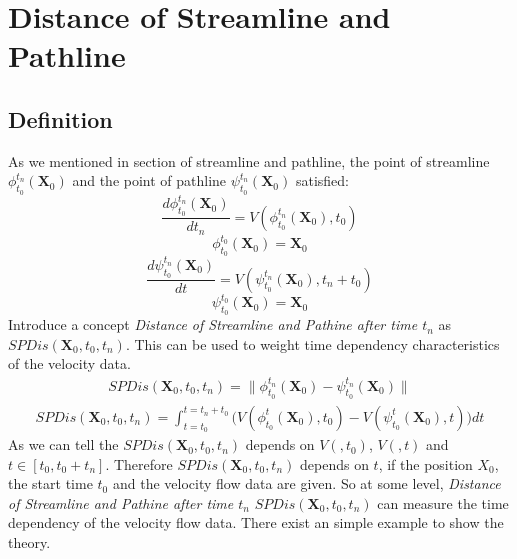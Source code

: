 \documentclass[
     11pt,         %
     a4paper,      %
     oneside,
     ]{article}
\newcommand{\vect}[1]{\boldsymbol{#1}}
\begin{document}
	
	
	\section{Distance of Streamline and Pathline}

	
   \subsection{Definition}
    As we mentioned in section of streamline and pathline, the point of streamline $\phi_{t_{0}}^{t_{n}}(\vect{X}_{0})$ and the point of pathline $\psi_{t_{0}}^{t_{n}}(\vect{X}_{0})$ satisfied:
    $$	\frac{d\phi_{t_{0}}^{t_{n}}(\vect{X}_{0})}{dt_{n}}=V(\phi_{t_{0}}^{t_{n}}(\vect{X}_{0}),t_{0})$$
    	$$\phi_{t_{0}}^{t_{0}}(\vect{X}_{0})=\vect{X}_{0}$$
    $$		\frac{d\psi_{t_{0}}^{t_{n}}(\vect{X}_{0})}{dt}=V(\psi_{t_{0}}^{t_{n}}(\vect{X}_{0}),t_{n}+t_{0})$$
    $$	\psi_{t_{0}}^{t_{0}}(\vect{X}_{0})=\vect{X}_{0}$$
	Introduce a concept \textit{Distance of Streamline and Pathine after time $t_{n}$} as \textbf{$SPDis(\vect{X}_{0},t_{0},t_{n})$}. This can be used to weight time dependency characteristics of the velocity data.
	\begin{eqnarray}
	SPDis(\vect{X}_{0},t_{0},t_{n})=\biggr\lVert\phi_{t_{0}}^{t_{n}}(\vect{X}_{0})-\psi_{t_{0}}^{t_{n}}(\vect{X}_{0})\biggr\rVert
	\end{eqnarray}
	\begin{eqnarray}
	SPDis(\vect{X}_{0},t_{0},t_{n})=\int_{t=t_{0}}^{t=t_{n}+t_{0}}\biggr( V(\phi_{t_{0}}^{t}(\vect{X}_{0}),t_{0})-V(\psi_{t_{0}}^{t}(\vect{X}_{0}),t)\biggr) dt
	\end{eqnarray}
    As we can tell the $SPDis(\vect{X}_{0},t_{0},t_{n})$ depends on $V(,t_{0})$, $V(,t)$ and $t\in [t_{0},t_{0}+t_{n}]$. Therefore $SPDis(\vect{X}_{0},t_{0},t_{n})$ depends on $t$, if the position $X_{0}$, the start time $t_{0}$ and the velocity flow data are given. So at some level, \textit{Distance of Streamline and Pathine after time $t_{n}$} $SPDis(\vect{X}_{0},t_{0},t_{n})$ can measure the time dependency of the velocity flow data. There exist an simple example to show the theory.
\end{document}
